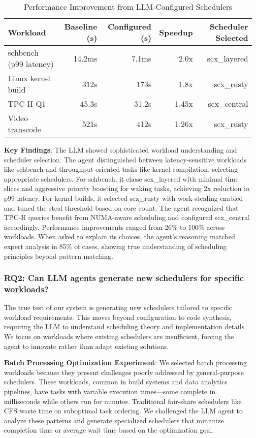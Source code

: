 \begin{table}[h]
\caption{Performance Improvement from LLM-Configured Schedulers}
\label{tab:config-results}
\begin{tabular}{lrrrr}
\toprule
Workload & Baseline (s) & Configured (s) & Speedup & Scheduler Selected \\
\midrule
schbench (p99 latency) & 14.2ms & 7.1ms & 2.0x & scx\_layered \\
Linux kernel build & 312s & 173s & 1.8x & scx\_rusty \\
TPC-H Q1 & 45.3s & 31.2s & 1.45x & scx\_central \\
Video transcode & 521s & 412s & 1.26x & scx\_rusty \\
\bottomrule
\end{tabular}
\end{table}

\textbf{Key Findings}: The LLM showed sophisticated workload understanding and scheduler selection. The agent distinguished between latency-sensitive workloads like schbench and throughput-oriented tasks like kernel compilation, selecting appropriate schedulers. For schbench, it chose scx\_layered with minimal time slices and aggressive priority boosting for waking tasks, achieving 2x reduction in p99 latency. For kernel builds, it selected scx\_rusty with work-stealing enabled and tuned the steal threshold based on core count. The agent recognized that TPC-H queries benefit from NUMA-aware scheduling and configured scx\_central accordingly. Performance improvements ranged from 26\% to 100\% across workloads. When asked to explain its choices, the agent's reasoning matched expert analysis in 85\% of cases, showing true understanding of scheduling principles beyond pattern matching.

\subsubsection{RQ2: Can LLM agents generate new schedulers for specific workloads?}

The true test of our system is generating new schedulers tailored to specific workload requirements. This moves beyond configuration to code synthesis, requiring the LLM to understand scheduling theory and implementation details. We focus on workloads where existing schedulers are insufficient, forcing the agent to innovate rather than adapt existing solutions.

\textbf{Batch Processing Optimization Experiment}: We selected batch processing workloads because they present challenges poorly addressed by general-purpose schedulers. These workloads, common in build systems and data analytics pipelines, have tasks with variable execution times—some complete in milliseconds while others run for minutes. Traditional fair-share schedulers like CFS waste time on suboptimal task ordering. We challenged the LLM agent to analyze these patterns and generate specialized schedulers that minimize completion time or average wait time based on the optimization goal.

